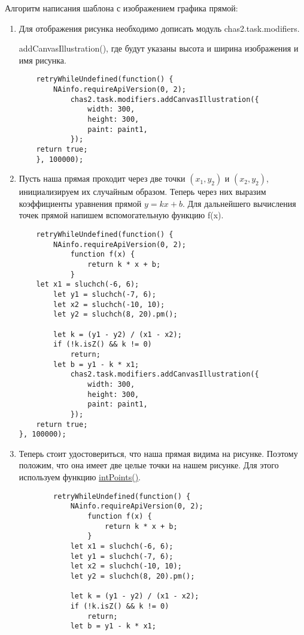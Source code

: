 Алгоритм написания шаблона с изображением графика прямой:
\begin{enumerate}
    \item Для отображения рисунка необходимо дописать модуль chas2.task.modifiers.

          addCanvasIllustration(), где будут указаны высота и ширина изображения и имя рисунка.
          \begin{verbatim}
    retryWhileUndefined(function() {
	    NAinfo.requireApiVersion(0, 2);
            chas2.task.modifiers.addCanvasIllustration({
                width: 300,
                height: 300,
                paint: paint1,
            });
    return true;
    }, 100000);
    \end{verbatim}
    \item Пусть наша прямая проходит через две точки $(x_1,y_2)$ и $(x_2,y_2)$, инициализируем их случайным образом. Теперь через них выразим коэффициенты уравнения прямой $y=kx+b$.
          Для дальнейшего вычисления точек прямой напишем вспомогательную функцию f(x).
          \begin{verbatim}
    retryWhileUndefined(function() {
	    NAinfo.requireApiVersion(0, 2);
            function f(x) {
                return k * x + b;
            }
    let x1 = sluchch(-6, 6);
	    let y1 = sluchch(-7, 6);
	    let x2 = sluchch(-10, 10);
	    let y2 = sluchch(8, 20).pm();

	    let k = (y1 - y2) / (x1 - x2);
	    if (!k.isZ() && k != 0)
		    return;
	    let b = y1 - k * x1;
            chas2.task.modifiers.addCanvasIllustration({
                width: 300,
                height: 300,
                paint: paint1,
            });
	return true;
}, 100000);
    \end{verbatim}
    \item Теперь стоит удостовериться, что наша прямая видима на рисунке.
          Поэтому положим, что она имеет две целые точки на нашем рисунке. Для этого используем функцию  \hyperlink{intPoints}{intPoints()}.
          \begin{verbatim}
        retryWhileUndefined(function() {
            NAinfo.requireApiVersion(0, 2);
                function f(x) {
                    return k * x + b;
                }
            let x1 = sluchch(-6, 6);
            let y1 = sluchch(-7, 6);
            let x2 = sluchch(-10, 10);
            let y2 = sluchch(8, 20).pm();
    
            let k = (y1 - y2) / (x1 - x2);
            if (!k.isZ() && k != 0)
                return;
            let b = y1 - k * x1;


\end{verbatim}
\end{enumerate}
